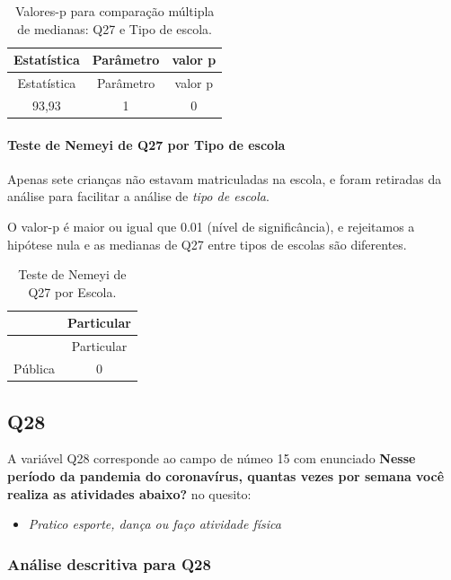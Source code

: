 \documentclass[]{article}
\providecommand{\tightlist}{%
  \setlength{\itemsep}{0pt}\setlength{\parskip}{0pt}}
\let\oldparagraph\paragraph
\renewcommand{\paragraph}[1]{\oldparagraph{#1}\mbox{}}
\begin{document}
\begin{longtable}[]{@{}ccc@{}}
\caption{\label{tab:unnamed-chunk-827}Valores-p para comparação múltipla de medianas: Q27 e Tipo de escola.}\tabularnewline
\toprule
Estatística & Parâmetro & valor p\tabularnewline
\midrule
\endfirsthead
\toprule
Estatística & Parâmetro & valor p\tabularnewline
\midrule
\endhead
93,93 & 1 & 0\tabularnewline
\bottomrule
\end{longtable}

\hypertarget{teste-de-nemeyi-de-q27-por-tipo-de-escola}{%
\paragraph{Teste de Nemeyi de Q27 por Tipo de escola}\label{teste-de-nemeyi-de-q27-por-tipo-de-escola}}

Apenas sete crianças não estavam matriculadas na escola, e foram retiradas da análise para facilitar a análise de \emph{tipo de escola}.

O valor-p é maior ou igual que 0.01 (nível de significância), e rejeitamos a hipótese nula e as medianas de Q27 entre tipos de escolas são diferentes.

\begin{longtable}[]{@{}lc@{}}
\caption{\label{tab:unnamed-chunk-829}Teste de Nemeyi de Q27 por Escola.}\tabularnewline
\toprule
& Particular\tabularnewline
\midrule
\endfirsthead
\toprule
& Particular\tabularnewline
\midrule
\endhead
Pública & 0\tabularnewline
\bottomrule
\end{longtable}

\cleardoublepage

\hypertarget{q28}{%
\subsection{Q28}\label{q28}}

A variável Q28 corresponde ao campo de númeo 15 com enunciado \textbf{Nesse período da pandemia do coronavírus, quantas vezes por semana você realiza as atividades abaixo?} no quesito:

\begin{itemize}
\tightlist
\item
  \emph{Pratico esporte, dança ou faço atividade física}
\end{itemize}

\hypertarget{anuxe1lise-descritiva-para-q28}{%
\subsubsection{Análise descritiva para Q28}\label{anuxe1lise-descritiva-para-q28}}
\end{document}
